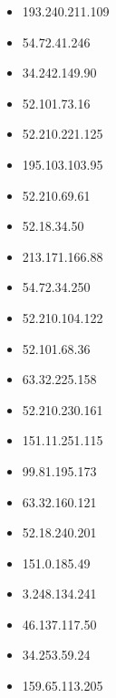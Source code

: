 \documentclass{article}
\begin{document}
\begin{itemize}
    
        \item 193.240.211.109
    
        \item 54.72.41.246
    
        \item 34.242.149.90
    
        \item 52.101.73.16
    
        \item 52.210.221.125
    
        \item 195.103.103.95
    
        \item 52.210.69.61
    
        \item 52.18.34.50
    
        \item 213.171.166.88
    
        \item 54.72.34.250
    
        \item 52.210.104.122
    
        \item 52.101.68.36
    
        \item 63.32.225.158
    
        \item 52.210.230.161
    
        \item 151.11.251.115
    
        \item 99.81.195.173
    
        \item 63.32.160.121
    
        \item 52.18.240.201
    
        \item 151.0.185.49
    
        \item 3.248.134.241
    
        \item 46.137.117.50
    
        \item 34.253.59.24
    
        \item 159.65.113.205
    

\end{itemize}
\end{document}
